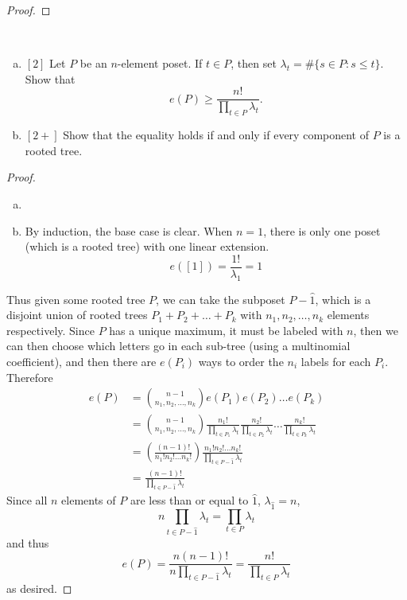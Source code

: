 \documentclass{article}
\newenvironment{problem}[2][Problem]{\begin{trivlist}
\item[\hskip \labelsep {\bfseries #1}\hskip \labelsep {\bfseries #2.}]}{\end{trivlist}}
\begin{document}
\begin{proof}
\end{proof}
\pagebreak
\begin{problem}{57} ~
  \begin{enumerate}[a.]
    \item $[2]$ Let $P$ be an $n$-element poset. If $t \in P$, then set
    $\lambda_t = \#\{s \in P : s \leq t\}$.
    Show that \[
      e(P) \geq \frac{n!}{ \prod_{t \in P} \lambda_t}.
    \]
    \item $[2+]$ Show that the equality holds if and only if every component of $P$ is
    a rooted tree.
  \end{enumerate}
\end{problem}

\begin{proof}
  \begin{enumerate}[a.]
    \item
    \item By induction, the base case is clear. When $n=1$, there is only
    one poset (which is a rooted tree) with one linear extension. \[
      e([1]) = \frac{1!}{\lambda_{1}} = 1
    \]
  \end{enumerate}
  Thus given some rooted tree $P$, we can take the subposet $P - \hat 1$, which
  is a disjoint union of rooted trees
  $P_1 + P_2 + \hdots + P_k$ with $n_1, n_2, \hdots, n_k$ elements respectively.
  Since $P$ has a unique maximum, it must be labeled with $n$, then we can
  then choose which letters go in each sub-tree (using a multinomial
  coefficient), and then there are $e(P_i)$ ways to order the $n_i$ labels
  for each $P_i$. Therefore \begin{align*}
      e(P) &= \binom{n - 1}{n_1, n_2, \hdots, n_k}e(P_1)e(P_2)\hdots e(P_k)
      \\
      &= \binom{n - 1}{n_1, n_2, \hdots, n_k}
      \frac{n_1!}{\prod_{t \in P_1} \lambda_t}
      \frac{n_2!}{\prod_{t \in P_2} \lambda_t}
      \hdots
      \frac{n_k!}{\prod_{t \in P_k} \lambda_t}
      \\
      &= \left(\frac{(n - 1)!}{n_1! n_2! \hdots n_k!}\right)
      \frac{n_1!n_2!\hdots n_k!}{\prod_{t \in P - \hat 1} \lambda_t}
      \\
      &= \frac{(n-1)!}{\prod_{t \in P - \hat 1} \lambda_t}
  \end{align*}
  Since all $n$ elements of $P$ are less than or equal to $\hat 1$,
  $\lambda_{\hat 1} = n$, \[
    n\prod_{t \in P - \hat 1} \lambda_t = \prod_{t \in P} \lambda_t
  \] and thus \[
    e(P) = \frac{n(n-1)!}{n\prod_{t \in P - \hat 1} \lambda_t} = \frac{n!}{\prod_{t \in P} \lambda_t}
  \] as desired.
\end{proof}
\end{document}
